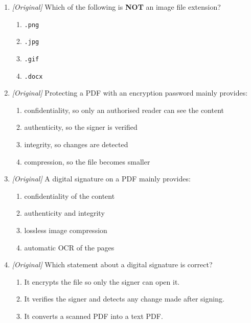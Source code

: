 \begin{enumerate}[label=\textbf{Q\arabic*.}, leftmargin=*]
  \begin{enumerate}[label=\Alph*.]
    \item \texttt{.docx}
    \item \texttt{.pptx}
    \item \texttt{.txt}
    \item \texttt{.pdf}
  \end{enumerate}
\item \textit{[Original]} Which of the following is \textbf{NOT} an image
  file extension?
  \begin{enumerate}[label=\Alph*.]
    \item \texttt{.png}
    \item \texttt{.jpg}
    \item \texttt{.gif}
    \item \texttt{.docx}
  \end{enumerate}
\item \textit{[Original]} Protecting a PDF with an encryption password mainly
  provides:
  \begin{enumerate}[label=\Alph*.]
    \item confidentiality, so only an authorised reader can see the content
    \item authenticity, so the signer is verified
    \item integrity, so changes are detected
    \item compression, so the file becomes smaller
  \end{enumerate}
\item \textit{[Original]} A digital signature on a PDF mainly provides:
  \begin{enumerate}[label=\Alph*.]
    \item confidentiality of the content
    \item authenticity and integrity
    \item lossless image compression
    \item automatic OCR of the pages
  \end{enumerate}
\item \textit{[Original]} Which statement about a digital signature is
  correct?
  \begin{enumerate}[label=\Alph*.]
    \item It encrypts the file so only the signer can open it.
    \item It verifies the signer and detects any change made after signing.
    \item It converts a scanned PDF into a text PDF.

\end{enumerate}
\end{enumerate}
